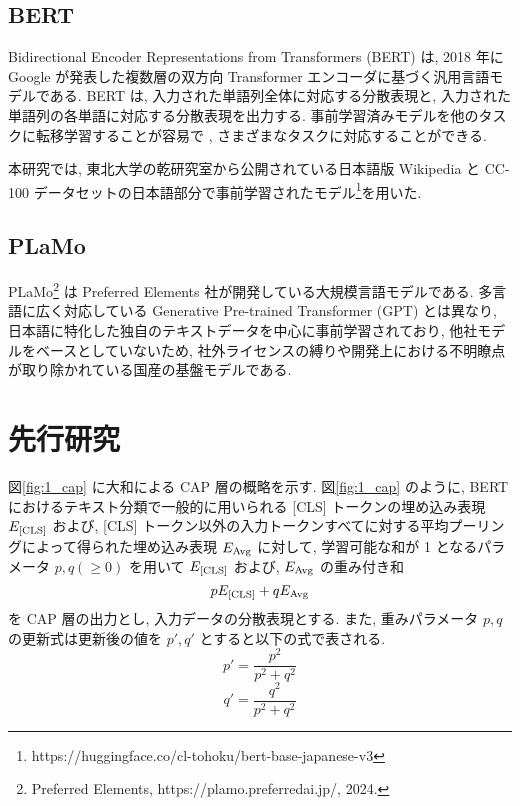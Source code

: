 \documentclass[twocolumn]{jarticle}
\begin{document}
\subsection{BERT}
Bidirectional Encoder Representations from Transformers (BERT) \cite{devlin-etal-2019-bert} は, 2018 年に
Google が発表した複数層の双方向 Transformer エンコーダに基づく汎用言語モデルである.
BERT は, 入力された単語列全体に対応する分散表現と, 入力された単語列の各単語に対応する分散表現を出力する. 事前学習済みモデルを他のタスクに転移学習することが容易で
, さまざまなタスクに対応することができる.

本研究では, 東北大学の乾研究室から公開されている日本語版 Wikipedia と CC-100 データセットの日本語部分で事前学習されたモデル\footnote{ https://huggingface.co/cl-tohoku/bert-base-japanese-v3}を用いた.

\subsection{PLaMo}
PLaMo\footnote{ Preferred Elements, https://plamo.preferredai.jp/, 2024.} は Preferred Elements 社が開発している大規模言語モデルである. 多言語に広く対応している Generative Pre-trained Transformer (GPT)\cite{radford2018improving} とは異なり, 日本語に特化した独自のテキストデータを中心に事前学習されており, 他社モデルをベースとしていないため, 社外ライセンスの縛りや開発上における不明瞭点が取り除かれている国産の基盤モデルである.

\section{先行研究}
図\ref{fig:1_cap} に大和\cite{yamato}による CAP 層の概略を示す. 図\ref{fig:1_cap} のように,
BERT におけるテキスト分類で一般的に用いられる [CLS] トークンの埋め込み表現 $E_{\rm{[CLS]}}$ および, [CLS] トークン以外の入力トークンすべてに対する平均プーリングによって得られた埋め込み表現 $E_{\rm{Avg}}$ に対して, 学習可能な和が 1 となるパラメータ $p, q (\geq0)$ を用いて $E_{\rm{[CLS]}}$ および, $E_{\rm{Avg}}$ の重み付き和
\begin{equation}
  pE_{\rm{[CLS]}}+qE_{\rm{Avg}}
\end{equation}
を CAP 層の出力とし, 入力データの分散表現とする. また, 重みパラメータ $p, q$ の更新式は更新後の値を $p', q'$ とすると以下の式で表される.
\begin{equation}
  p' = \frac{p^{2}}{p^{2}+q^{2}}
\end{equation}
\begin{equation}
  q' = \frac{q^{2}}{p^{2}+q^{2}}
\end{equation}
\end{document}
